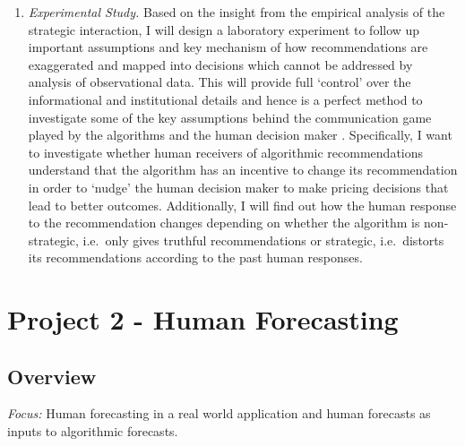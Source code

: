 \documentclass[12pt,a4paper]{article}
\begin{document}
\begin{enumerate}
\item \emph{Experimental Study.} Based on the insight from the empirical analysis of the strategic interaction, I will design a laboratory experiment to follow up important assumptions and key mechanism of how recommendations are exaggerated and mapped into decisions which cannot be addressed by analysis of observational data. This will provide full `control' over the informational and institutional details and hence is a perfect method to investigate some of the key assumptions behind the communication game played by the algorithms and the human decision maker \citep[for an overview of human vs computer players in controlled economic experiments, see][]{march2019behavioral}.
%
Specifically, I want to investigate whether human receivers of algorithmic recommendations understand that the algorithm has an incentive to change its recommendation in order to `nudge' the human decision maker to make pricing decisions that lead to better outcomes. Additionally, I will find out how the human response to the recommendation changes depending on whether the algorithm is non-strategic, i.e.~only gives truthful recommendations or strategic, i.e.~distorts its recommendations according to the past human responses.

\end{enumerate}


\section{Project 2 - Human Forecasting}
\label{sec:human_forecasting}

\subsection{Overview}

\emph{Focus:} Human forecasting in a real world application and human forecasts as inputs to algorithmic forecasts.     
      
\end{document}
